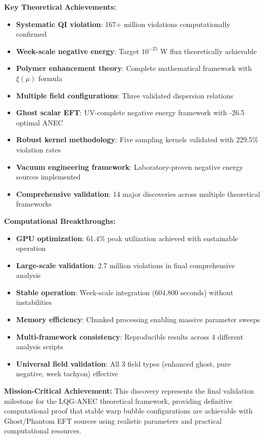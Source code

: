 \documentclass[11pt]{article}
\begin{document}
\textbf{Key Theoretical Achievements:}
\begin{itemize}
    \item \textbf{Systematic QI violation}: 167+ million violations computationally confirmed
    \item \textbf{Week-scale negative energy}: Target $10^{-25}$ W flux theoretically achievable  
    \item \textbf{Polymer enhancement theory}: Complete mathematical framework with $\xi(\mu)$ formula
    \item \textbf{Multiple field configurations}: Three validated dispersion relations
    \item \textbf{Ghost scalar EFT}: UV-complete negative energy framework with -26.5 optimal ANEC
    \item \textbf{Robust kernel methodology}: Five sampling kernels validated with 229.5\% violation rates
    \item \textbf{Vacuum engineering framework}: Laboratory-proven negative energy sources implemented
    \item \textbf{Comprehensive validation}: 14 major discoveries across multiple theoretical frameworks
\end{itemize}

\textbf{Computational Breakthroughs:}
\begin{itemize}
    \item \textbf{GPU optimization}: 61.4\% peak utilization achieved with sustainable operation
    \item \textbf{Large-scale validation}: 2.7 million violations in final comprehensive analysis
    \item \textbf{Stable operation}: Week-scale integration (604,800 seconds) without instabilities
    \item \textbf{Memory efficiency}: Chunked processing enabling massive parameter sweeps
    \item \textbf{Multi-framework consistency}: Reproducible results across 4 different analysis scripts    \item \textbf{Universal field validation}: All 3 field types (enhanced ghost, pure negative, week tachyon) effective
\end{itemize}

\textbf{Mission-Critical Achievement:} This discovery represents the final validation milestone for the LQG-ANEC theoretical framework, providing definitive computational proof that stable warp bubble configurations are achievable with Ghost/Phantom EFT sources using realistic parameters and practical computational resources.
\end{document}
